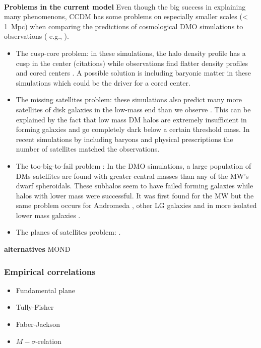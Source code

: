 \\\textbf{Problems in the current model}
Even though the big success in explaining many phenomenons, \ac{CCDM} has some problems on especially smaller scales (< \SI{1}{Mpc}) when comparing the predictions of cosmological \ac{DMO} simulations to observations ( e.g., \cite{Bullock...LCDMprobs...2017}). 
\begin{itemize}
    \item The cusp-core problem: in these simulations, the halo density profile has a cusp in the center (citations) while observations find flatter density profiles and cored centers \citep{Flores...cuspcoreprob...1994, Moore...cuspcoreprob...1994}. A possible solution is including baryonic matter in these simulations which could be the driver for a cored center.
    \item The missing satellites problem: these simulations also predict many more satellites of disk galaxies in the low-mass end than we observe \citep{Klypin...missingsatellites...1999, Moore...missingsatellites..1999}. This can be explained by the fact that low mass \ac{DM} halos are extremely insufficient in forming galaxies and go completely dark below a certain threshold mass. In recent simulations by \citet{Sawala...noCDMproblems...2016} including baryons and physical prescriptions the number of satellites matched the observations.
    \item The too-big-to-fail problem \citep{Boylan...toobigtoofail...2011}: In the \ac{DMO} simulations, a large population of \acp{DM} satellites are found with greater central masses than any of the \ac{MW}'s dwarf spheroidals. These subhalos seem to have failed forming galaxies while halos with lower mass were successful. It was first found for the \ac{MW} but the same problem occurs for Andromeda \citep{Tollerud...M31tbtf...2014}, other \ac{LG} galaxies \citep{Kirby...LGtbtf...2014} and in more isolated lower mass galaxies \citep{Ferrero...DGtbtf...2012, Papastergis...DGtbtf...2015, Papastergis...DGtbtf...2016}.
    \item The planes of satellites problem: .
\end{itemize}

\textbf{alternatives}
MOND
\subsubsection{Empirical correlations}
\begin{itemize}
    \item Fundamental plane
    \item Tully-Fisher
    \item Faber-Jackson
    \item $M-\sigma$-relation
\end{itemize}
